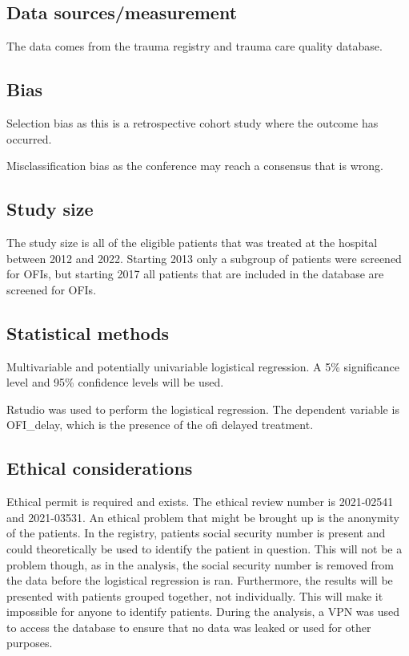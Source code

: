 \documentclass[
]{article}
\begin{document}
\hypertarget{data-sourcesmeasurement}{%
\subsection{Data sources/measurement}\label{data-sourcesmeasurement}}

The data comes from the trauma registry and trauma care quality
database.

\hypertarget{bias}{%
\subsection{Bias}\label{bias}}

Selection bias as this is a retrospective cohort study where the outcome
has occurred.

Misclassification bias as the conference may reach a consensus that is
wrong.

\hypertarget{study-size}{%
\subsection{Study size}\label{study-size}}

The study size is all of the eligible patients that was treated at the
hospital between 2012 and 2022. Starting 2013 only a subgroup of
patients were screened for OFIs, but starting 2017 all patients that are
included in the database are screened for OFIs.

\hypertarget{statistical-methods}{%
\subsection{Statistical methods}\label{statistical-methods}}

Multivariable and potentially univariable logistical regression. A 5\%
significance level and 95\% confidence levels will be used.

Rstudio was used to perform the logistical regression. The dependent
variable is OFI\_delay, which is the presence of the ofi delayed
treatment.

\hypertarget{ethical-considerations}{%
\subsection{Ethical considerations}\label{ethical-considerations}}

Ethical permit is required and exists. The ethical review number is
2021-02541 and 2021-03531. An ethical problem that might be brought up
is the anonymity of the patients. In the registry, patients social
security number is present and could theoretically be used to identify
the patient in question. This will not be a problem though, as in the
analysis, the social security number is removed from the data before the
logistical regression is ran. Furthermore, the results will be presented
with patients grouped together, not individually. This will make it
impossible for anyone to identify patients. During the analysis, a VPN
was used to access the database to ensure that no data was leaked or
used for other purposes.
\end{document}
